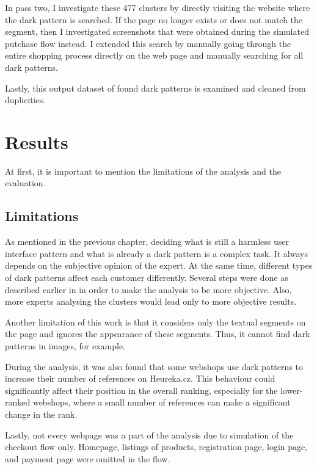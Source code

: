         In pass two, I investigate these 477 clusters by directly visiting the website where the dark pattern is searched. If the page no longer exists or does not match the segment, then I investigated screenshots that were obtained during the simulated putchase flow instead. I extended this search by manually going through the entire shopping process directly on the web page and manually searching for all dark patterns.
        
        Lastly, this output dataset of found dark patterns is examined and cleaned from duplicities.

    \section{Results}

    At first, it is important to mention the limitations of the analysis and the evaluation.
    
    \subsection*{Limitations}
    As mentioned in the previous chapter, deciding what is still a harmless user interface pattern and what is already a dark pattern is a complex task. It always depends on the subjective opinion of the expert. At the same time, different types of dark patterns affect each customer differently. Several steps were done as described earlier in  in order to make the analysis to be more objective. Also, more experts analysing the clusters would lead only to more objective results.
    
    Another limitation of this work is that it considers only the textual segments on the page and ignores the appearance of these segments. Thus, it cannot find dark patterns in images, for example.
    
    During the analysis, it was also found that some webshops use dark patterns to increase their number of references on Heureka.cz. This behaviour could significantly affect their position in the overall ranking, especially for the lower-ranked webshops, where a small number of references can make a significant change in the rank.
    
    Lastly, not every webpage was a part of the analysis due to simulation of the checkout flow only. Homepage, listings of products, registration page, login page, and payment page were omitted in the flow.
    

